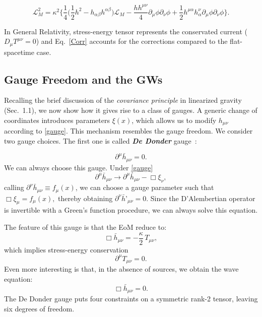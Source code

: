 \documentclass[12pt,a4paper,oneside]{article}
\numberwithin{equation}{section}   %
\begin{document}
\begin{equation}
\boxed{
\mathcal{L}^{2}_M=\kappa^2 \Biggl\{
\frac{1}{4}\bigl(\frac12h^2-h_{\alpha\beta}h^{\alpha\beta}\bigr)\mathcal{L}_M - \frac{hh^{\mu\nu}}
{4}\partial_\mu\phi\partial_\nu\phi + \frac{1}{2}h^{\mu\alpha}h_\alpha^\nu \partial_\mu\phi\partial_\nu\phi
\Biggr\}.
}\label{Corr}
\end{equation}

In General Relativity, stress-energy tensor represents
the conservated current ($D_\mu T^{\mu\nu}=0$) and
 Eq.~\eqref{Corr} accounts for the corrections 
 compared 
to the flat-spacetime case.
 
\subsection{Gauge Freedom and the GWs}
Recalling the brief discussion of the \textit{covariance principle} in
linearized gravity (Sec.~1.1), we now show how it gives rise to a 
class of gauges.
A generic change of coordinates introduces
 parameters $\xi (x)$,
which allows us to modify $h_{\mu\nu}$ according to \eqref{gauge}. This mechanism
resembles the gauge freedom. We consider two gauge choices. The first one is called
\textbf{\textit{De Donder}} gauge~\cite{Maggiore2008}:

\begin{equation}
\boxed{\partial^\mu\bar{h}_{\mu\nu} = 0.}
\label{eq:DD}
\end{equation}
We can always choose this gauge. Under \eqref{gauge}
\begin{equation}
\partial^\mu \bar{h}_{\mu\nu} \to \partial^\mu \bar{h}_{\mu\nu} - \Box \xi_\nu,
\end{equation}
 calling $
\partial^\nu \bar h_{\mu\nu} \equiv f_\mu(x)
$,
we can choose a gauge parameter such that
$
\Box \xi _\mu=f_\mu(x),
$
thereby obtaining
$
\partial^\nu \bar{h}’_{\mu\nu}=0
$. 
Since the D'Alembertian operator is invertible with
a Green's function procedure, we can always solve this equation.

The feature of this gauge is that the EoM reduce to:
\begin{equation}
\Box \bar{h}_{\mu\nu} = -\frac{\kappa}{2}\, T_{\mu\nu},
\label{eq:EoM}
\end{equation}
which implies stress-energy conservation
\begin{equation}
\partial^\mu T_{\mu\nu} = 0.
\end{equation}
Even more interesting is that,
in the absence of sources, we obtain the wave equation:
\begin{equation}
    \boxed{
\Box \bar{h}_{\mu\nu} = 0.
}\label{eq:EoM2}
\end{equation}
The De Donder gauge puts four constraints on 
a symmetric rank-2 tensor, leaving six degrees of freedom.
\\
\end{document}
